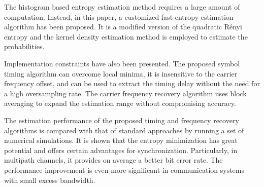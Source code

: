 \documentclass[12pt, draftclsnofoot, onecolumn]{IEEEtran}
\begin{document}
The histogram based entropy estimation method requires a large amount of computation.
Instead, in this paper, a customized fast entropy estimation algorithm has been proposed.
It is a modified version of the quadratic R\'enyi entropy and the kernel density estimation method is employed to estimate the probabilities.

Implementation constraints have also been presented. 
The proposed symbol timing algorithm can overcome local minima, it is insensitive to the carrier frequency offset, and can be used to extract the timing delay without the need for a high oversampling rate.
The carrier frequency recovery algorithm uses block averaging to expand the estimation range without compromising accuracy. 

The estimation performance of the proposed timing and frequency recovery algorithms is compared with that of standard approaches by running a set of numerical simulations. 
It is shown that the entropy minimization has great potential and offers certain advantages for synchronization.
Particularly, in multipath channels, it provides on average a better bit error rate. 
The performance improvement is even more significant in communication systems with small excess bandwidth. 

% 
% 
\small


\end{document}

